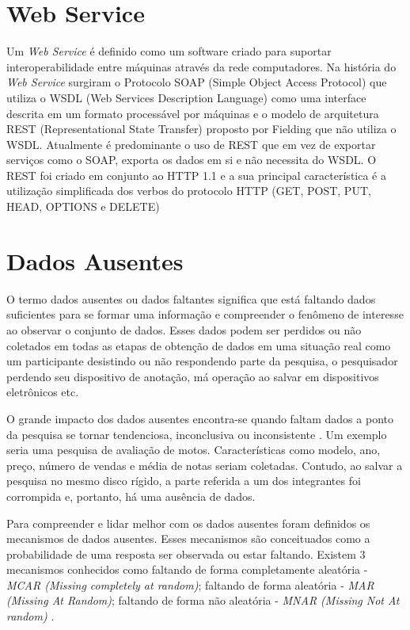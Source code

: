 \documentclass[
	12pt,				%
	openright,			%
	oneside,			%
	a4paper,			%
	english,			%
	brazil				%
	]{abntex2}
\begin{document}
	\section{Web Service}
		Um \emph{Web Service} \cite{webService-W3C} é definido como um software criado para suportar interoperabilidade entre máquinas através da rede computadores.
		Na história do \emph{Web Service} surgiram o Protocolo SOAP (Simple Object Access Protocol) que utiliza o WSDL (Web Services Description Language) como uma interface descrita em um formato processável por máquinas \cite{webService-W3C} e o modelo de arquitetura REST (Representational State Transfer) proposto por Fielding \cite{fielding2000architectural} que não utiliza o WSDL.
		Atualmente é predominante o uso de REST que em vez de exportar serviços como o SOAP, exporta os dados em si e não necessita do WSDL. \cite{soapVSrest}
		O REST foi criado em conjunto ao HTTP 1.1 e a sua principal característica é a utilização simplificada dos verbos do protocolo HTTP (GET, POST, PUT, HEAD, OPTIONS e DELETE) \cite{WSRestvsSOAP}

	\section{Dados Ausentes}
		O termo dados ausentes ou dados faltantes significa que está faltando dados suficientes para se formar uma informação e
		compreender o fenômeno de interesse ao observar o conjunto de dados. \cite{patrickmcknight2007}
		Esses dados podem ser perdidos ou não coletados em todas as etapas de obtenção de dados em uma situação real
		como um participante desistindo ou não respondendo parte da pesquisa,
		o pesquisador perdendo seu dispositivo de anotação,
		má operação ao salvar em dispositivos eletrônicos etc. \cite{patrickmcknight2007}
		\par

		O grande impacto dos dados ausentes encontra-se quando faltam dados a ponto da pesquisa se tornar tendenciosa, inconclusiva ou inconsistente \cite{patrickmcknight2007}.
		Um exemplo seria uma pesquisa de avaliação de motos.
		Características como modelo, ano, preço, número de vendas e média de notas seriam coletadas.
		Contudo, ao salvar a pesquisa no mesmo disco rígido, a parte referida a um dos integrantes foi corrompida e, portanto, há uma ausência de dados.
		\par
		Para compreender e lidar melhor com os dados ausentes foram definidos os mecanismos de dados ausentes.
		Esses mecanismos são conceituados como a probabilidade de uma resposta ser observada ou estar faltando.
		Existem 3 mecanismos conhecidos como 
		faltando de forma completamente aleatória - \emph{MCAR  (Missing completely at random)};
		faltando de forma aleatória - \emph{MAR (Missing At Random)};
		faltando de forma não aleatória - \emph{ MNAR (Missing Not At random)} \cite{molenberghs2014handbook}.
\end{document}
